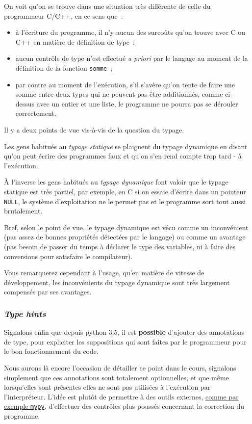     On voit qu'on se trouve dans une situation très différente de celle du
programmeur C/C++, en ce sens que~:

\begin{itemize}
\tightlist
\item
  à l'écriture du programme, il n'y aucun des surcoûts qu'on trouve avec
  C ou C++ en matière de définition de type~;
\item
  aucun contrôle de type n'est effectué \emph{a priori} par le langage
  au moment de la définition de la fonction \texttt{somme}~;
\item
  par contre au moment de l'exécution, s'il s'avère qu'on tente de faire
  une somme entre deux types qui ne peuvent pas être additionnés, comme
  ci-dessus avec un entier et une liste, le programme ne pourra pas se
  dérouler correctement.
\end{itemize}

    Il y a deux points de vue vis-à-vis de la question du typage.

Les gens habitués au \emph{typage statique} se plaignent du typage
dynamique en disant qu'on peut écrire des programmes faux et qu'on s'en
rend compte trop tard - à l'exécution.

À l'inverse les gens habitués au \emph{typage dynamique} font valoir que
le typage statique est très partiel, par exemple, en C si on essaie
d'écrire dans un pointeur \texttt{NULL}, le système d'exploitation ne le
permet pas et le programme sort tout aussi brutalement.

    Bref, selon le point de vue, le typage dynamique est vécu comme un
inconvénient (pas assez de bonnes propriétés détectées par le langage)
ou comme un avantage (pas besoin de passer du temps à déclarer le type
des variables, ni à faire des conversions pour satisfaire le
compilateur).

Vous remarquerez cependant à l'usage, qu'en matière de vitesse de
développement, les inconvénients du typage dynamique sont très largement
compensés par ses avantages.

    \hypertarget{type-hints}{%
\subsubsection{\texorpdfstring{\emph{Type
hints}}{Type hints}}\label{type-hints}}

    Signalons enfin que depuis python-3.5, il est \textbf{possible}
d'ajouter des annotations de type, pour expliciter les suppositions qui
sont faites par le programmeur pour le bon fonctionnement du code.

Nous aurons là encore l'occasion de détailler ce point dans le cours,
signalons simplement que ces annotations sont totalement optionnelles,
et que même lorsqu'elles sont présentes elles ne sont pas utilisées à
l'exécution par l'interpréteur. L'idée est plutôt de permettre à des
outils externes, \href{http://www.mypy-lang.org}{comme par exemple
\texttt{mypy}}, d'effectuer des contrôles plus poussés concernant la
correction du programme.


    
    
    
